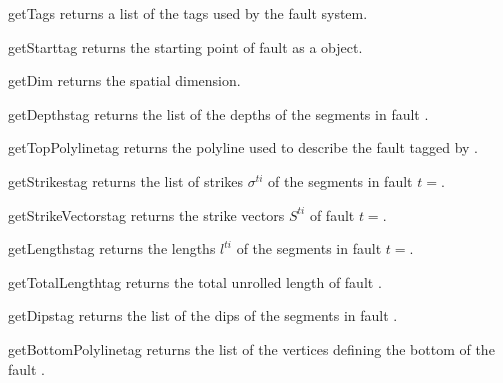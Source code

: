 \begin{methoddesc}[FaultSystem]{getTags}{}
returns a list of the tags used by the fault system.
\end{methoddesc}

\begin{methoddesc}[FaultSystem]{getStart}{tag}
returns the starting point of fault  as a \numpyNDA object.
\end{methoddesc}

\begin{methoddesc}[FaultSystem]{getDim}{}
returns the spatial dimension.
\end{methoddesc}

\begin{methoddesc}[FaultSystem]{getDepths}{tag}
returns the list of the depths of the segments in fault .
\end{methoddesc}

\begin{methoddesc}[FaultSystem]{getTopPolyline}{tag}
returns the polyline used to describe the fault tagged by .
\end{methoddesc}

\begin{methoddesc}[FaultSystem]{getStrikes}{tag}
returns the list of strikes $\sigma^{ti}$ of the segments in fault
$t=$.
\end{methoddesc}

\begin{methoddesc}[FaultSystem]{getStrikeVectors}{tag}
returns the strike vectors $S^{ti}$ of fault $t=$.
\end{methoddesc}

\begin{methoddesc}[FaultSystem]{getLengths}{tag}
returns the lengths $l^{ti}$ of the segments in fault $t=$.
\end{methoddesc}

\begin{methoddesc}[FaultSystem]{getTotalLength}{tag}
returns the total unrolled length of fault .
\end{methoddesc}

\begin{methoddesc}[FaultSystem]{getDips}{tag}
returns the list of the dips of the segments in fault .
\end{methoddesc}

\begin{methoddesc}[FaultSystem]{getBottomPolyline}{tag}
returns the list of the vertices defining the bottom of the fault .
\end{methoddesc}

